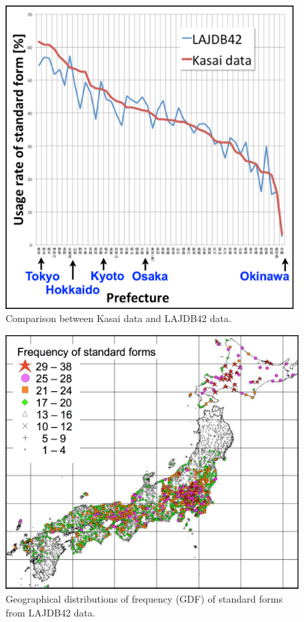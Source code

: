 \documentclass[output=paper]{LSP/langsci}
\begin{document}
\begin{figure}[p]
\includegraphics[height=0.4\textheight]{illustrations/kuma_fig05}
\caption{Comparison between Kasai data and LAJDB42 data.}    
\label{fig:5}
\end{figure} 
  
\begin{figure}[p]
\includegraphics[height=0.4\textheight]{illustrations/kuma_fig06}
\caption{Geographical distributions of frequency (GDF) of standard forms from LAJDB42 data.}          
\label{fig:6}
\end{figure} 
\end{document}
